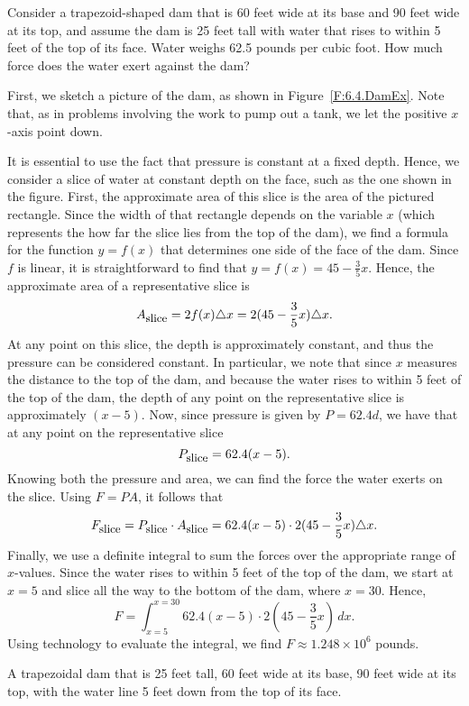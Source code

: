 

\begin{example} \label{eg:6.5.1} %
Consider a trapezoid-shaped dam that is 60 feet wide at its base and 90 feet wide at its top, and assume the dam is 25 feet tall with water that rises to within 5 feet of the top of its face.  Water weighs 62.5 pounds per cubic foot.  How much force does the water exert against the dam?

\solution First, we sketch a picture of the dam, as shown in Figure~\ref{F:6.4.DamEx}.  Note that, as in problems involving the work to pump out a tank, we let the positive $x$-axis point down.

It is essential to use the fact that pressure is constant at a fixed depth.  Hence, we consider a slice of water at constant depth on the face, such as the one shown in the figure.  First, the approximate area of this slice is the area of the pictured rectangle.  Since the width of that rectangle depends on the variable $x$ (which represents the how far the slice lies from the top of the dam), we find a formula for the function $y = f(x)$ that determines one side of the face of the dam.  Since $f$ is linear, it is straightforward to find that $y = f(x) = 45 - \frac{3}{5}x$.  Hence, the approximate area of a representative slice is
$$A_{\mbox{\small{slice}}} = 2 f(x) \triangle x = 2 (45 - \frac{3}{5}x) \triangle x.$$
At any point on this slice, the depth is approximately constant, and thus the pressure can be considered constant.  In particular, we note that since $x$ measures the distance to the top of the dam, and because the water rises to within 5 feet of the top of the dam, the depth of any point on the representative slice is approximately $(x-5)$.  Now, since pressure is given by $P = 62.4d$, we have that at any point on the representative slice
$$P_{\mbox{\small{slice}}} = 62.4(x-5).$$
Knowing both the pressure and area, we can find the force the water exerts on the slice.  Using $F = PA$, it follows that 
$$F_{\mbox{\small{slice}}} = P_{\mbox{\small{slice}}} \cdot A_{\mbox{\small{slice}}} = 62.4(x-5) \cdot 2 (45 - \frac{3}{5}x) \triangle x.$$
Finally, we use a definite integral to sum the forces over the appropriate range of $x$-values.  Since the water rises to within 5 feet of the top of the dam, we start at $x = 5$ and slice all the way to the bottom of the dam, where $x = 30$.  Hence,
$$F = \int_{x=5}^{x=30} 62.4(x-5) \cdot 2 (45 - \frac{3}{5}x) \, dx.$$
Using technology to evaluate the integral, we find $F \approx 1.248 \times 10^6$ pounds.
\end{example}

\begin{marginfigure}[-24cm] %
\caption{A trapezoidal dam that is 25 feet tall, 60 feet wide at its base, 90 feet wide at its top, with the water line 5 feet down from the top of its face.} \label{F:6.4.DamEx}
\end{marginfigure}
